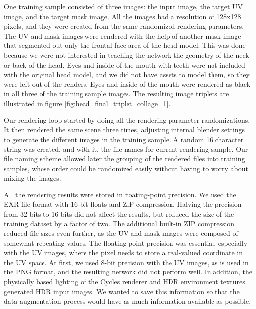 One training sample consisted of three images: the input image, the target UV image, and the target mask image. All the images had a resolution of 128x128 pixels, and they were created from the same randomized rendering parameters. The UV and mask images were rendered with the help of another mask image that segmented out only the frontal face area of the head model. This was done because we were not interested in teaching the network the geometry of the neck or back of the head. Eyes and inside of the mouth with teeth were not included with the original head model, and we did not have assets to model them, so they were left out of the renders. Eyes and inside of the mouth were rendered as black in all three of the training sample images. The resulting image triplets are illustrated in figure \ref{fig:head_final_triplet_collage_1}.

Our rendering loop started by doing all the rendering parameter randomizations. It then rendered the same scene three times, adjusting internal blender settings to generate the different images in the training sample. A random 16 character string was created, and with it, the file names for current rendering sample. Our file naming scheme allowed later the grouping of the rendered files into training samples, whose order could be randomized easily without having to worry about mixing the images.

All the rendering results were stored in floating-point precision. We used the EXR file format with 16-bit floats and ZIP compression. Halving the precision from 32 bits to 16 bits did not affect the results, but reduced the size of the training dataset by a factor of two. The additional built-in ZIP compression reduced file sizes even further, as the UV and mask images were composed of somewhat repeating values. The floating-point precision was essential, especially with the UV images, where the pixel needs to store a real-valued coordinate in the UV space. At first, we used 8-bit precision with the UV images, as is used in the PNG format, and the resulting network did not perform well. In addition, the physically based lighting of the Cycles renderer and \ac{HDR} environment textures generated \ac{HDR} input images. We wanted to save this information so that the data augmentation process would have as much information available as possible.

